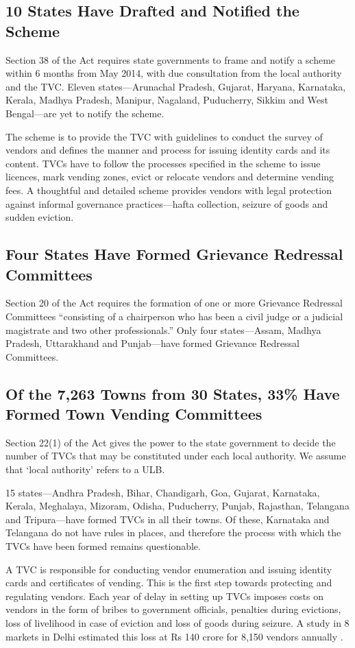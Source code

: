 \documentclass[a4paper, 12pt, twoside]{article}
\begin{document}
\subsection{10 States Have Drafted and Notified the Scheme}	
	Section 38 of the Act requires state governments to frame and notify a scheme within 6 months from May 2014, with due consultation from the local authority and the TVC. Eleven states—Arunachal Pradesh, Gujarat, Haryana, Karnataka, Kerala, Madhya Pradesh, Manipur, Nagaland, Puducherry, Sikkim and West Bengal—are yet to notify the scheme.

	The scheme is to provide the TVC with guidelines to conduct the survey of vendors and defines the manner and process for issuing identity cards and its content. TVCs have to follow the processes specified in the scheme to issue licences, mark vending zones, evict or relocate vendors and determine vending fees. A thoughtful and detailed scheme provides vendors with legal protection against informal governance practices—hafta collection, seizure of goods and sudden eviction.

\subsection{Four States Have Formed Grievance Redressal Committees}
	Section 20 of the Act requires the formation of one or more Grievance Redressal Committees “consisting of a chairperson who has been a civil judge or a judicial magistrate and two other professionals.” Only four states—Assam, Madhya Pradesh, Uttarakhand and Punjab—have formed Grievance Redressal Committees.

\subsection{Of the 7,263 Towns from 30 States, 33\% Have Formed Town Vending Committees}
	Section 22(1) of the Act gives the power to the state government to decide the number of TVCs that may be  constituted under each local authority. We assume that ‘local authority’ refers to a ULB.

	15 states—Andhra Pradesh, Bihar, Chandigarh, Goa, Gujarat, Karnataka, Kerala, Meghalaya, Mizoram, Odisha, Puducherry, Punjab, Rajasthan, Telangana and Tripura—have formed TVCs in all their towns. Of these, Karnataka and Telangana do not have rules in places, and therefore the process with which the TVCs have been formed remains questionable.

	A TVC is responsible for conducting vendor enumeration and issuing identity cards and certificates of vending. This is the first step towards protecting and regulating vendors. Each year of delay in setting up TVCs imposes costs on vendors in the form of bribes to government officials, penalties during evictions, loss of livelihood in case of eviction and loss of goods during seizure. A study in 8 markets in Delhi estimated this loss at Rs 140 crore for 8,150 vendors annually \parencite{Ratan 2015}.
\end{document}
